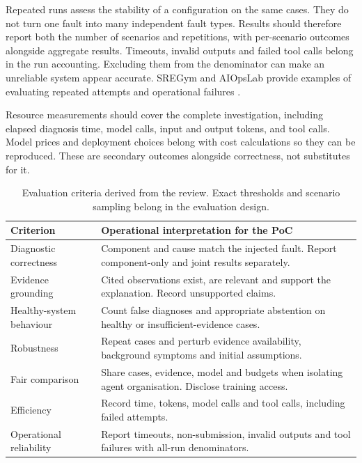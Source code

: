 Repeated runs assess the stability of a configuration on the same cases.
They do not turn one fault into many independent fault types. Results
should therefore report both the number of scenarios and repetitions,
with per-scenario outcomes alongside aggregate results. Timeouts, invalid
outputs and failed tool calls belong in the run accounting. Excluding them
from the denominator can make an unreliable system appear accurate.
SREGym and AIOpsLab provide examples of evaluating repeated attempts and
operational failures \parencite{clark2026sregym,chen2025aiopslab}.

Resource measurements should cover the complete investigation, including
elapsed diagnosis time, model calls, input and output tokens, and tool calls.
Model prices and deployment choices belong with cost calculations so they
can be reproduced. These are
secondary outcomes alongside correctness, not substitutes for it.

\begin{table}[htbp]
\centering
\small
\caption{Evaluation criteria derived from the review. Exact thresholds and
scenario sampling belong in the evaluation design.}
\label{tab:sota:evaluation}
\begin{tabularx}{\textwidth}{@{}p{}X@{}}
\toprule
Criterion & Operational interpretation for the PoC \\
\midrule
Diagnostic correctness & Component and cause match the injected fault. Report component-only and joint results separately. \\
Evidence grounding & Cited observations exist, are relevant and support the explanation. Record unsupported claims. \\
Healthy-system behaviour & Count false diagnoses and appropriate abstention on healthy or insufficient-evidence cases. \\
Robustness & Repeat cases and perturb evidence availability, background symptoms and initial assumptions. \\
Fair comparison & Share cases, evidence, model and budgets when isolating agent organisation. Disclose training access. \\
Efficiency & Record time, tokens, model calls and tool calls, including failed attempts. \\
Operational reliability & Report timeouts, non-submission, invalid outputs and tool failures with all-run denominators. \\
\bottomrule
\end{tabularx}
\end{table}

